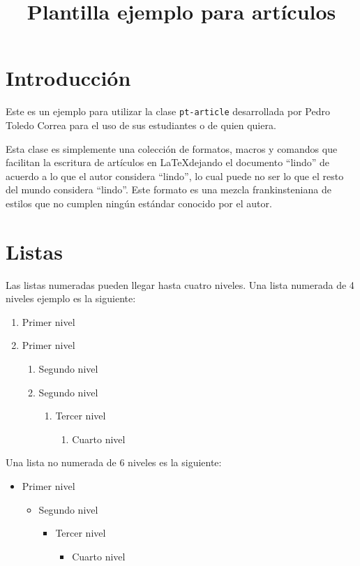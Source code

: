 \documentclass[letterpaper]{pt-article}
\title{Plantilla ejemplo para artículos}
\begin{document}
\tableofcontents
\listoffigures
\listoftables
\templaterule

\section{Introducción}

Este es un ejemplo para utilizar la clase \texttt{pt-article} desarrollada por Pedro Toledo Correa para el uso de sus estudiantes o de quien quiera.

Esta clase es simplemente una colección de formatos, macros y comandos que facilitan la escritura de artículos en \LaTeX dejando el documento ``lindo'' de acuerdo a lo que el autor considera ``lindo'', lo cual puede no ser lo que el resto del mundo considera ``lindo''. Este formato es una mezcla frankinsteniana de estilos que no cumplen ningún estándar conocido por el autor.

\section{Listas}

Las listas numeradas pueden llegar hasta cuatro niveles. Una lista numerada de 4 niveles ejemplo es la siguiente:

\begin{enumerate}
  \item Primer nivel
  \item Primer nivel
  \begin{enumerate}
    \item Segundo nivel
    \item Segundo nivel
    \begin{enumerate}
      \item Tercer nivel
      \begin{enumerate}
        \item Cuarto nivel
      \end{enumerate}
    \end{enumerate}
  \end{enumerate}
\end{enumerate}

Una lista no numerada de 6 niveles es la siguiente:

\begin{itemize}
 \item Primer nivel
 \begin{itemize}
  \item Segundo nivel
  \begin{itemize}
   \item Tercer nivel
   \begin{itemize}
    \item Cuarto nivel
   \end{itemize}
  \end{itemize}
 \end{itemize}
\end{itemize}
\end{document}
